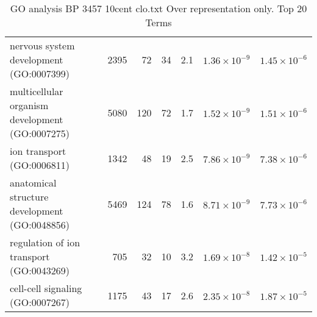 \begin{table}[ht]
\begin{adjustbox}{width=\textwidth}
\begin{tabular}{lrrrrrr}
  nervous system development (GO:0007399) & 2395 & 72 & 34 & 2.1 & $1.36 \times 10^{-9}$ & $1.45 \times 10^{-6}$ \\ 
  multicellular organism development (GO:0007275) & 5080 & 120 & 72 & 1.7 & $1.52 \times 10^{-9}$ & $1.51 \times 10^{-6}$ \\ 
  ion transport (GO:0006811) & 1342 & 48 & 19 & 2.5 & $7.86 \times 10^{-9}$ & $7.38 \times 10^{-6}$ \\ 
  anatomical structure development (GO:0048856) & 5469 & 124 & 78 & 1.6 & $8.71 \times 10^{-9}$ & $7.73 \times 10^{-6}$ \\ 
  regulation of ion transport (GO:0043269) & 705 & 32 & 10 & 3.2 & $1.69 \times 10^{-8}$ & $1.42 \times 10^{-5}$ \\ 
  cell-cell signaling (GO:0007267) & 1175 & 43 & 17 & 2.6 & $2.35 \times 10^{-8}$ & $1.87 \times 10^{-5}$ \\ 
   \hline
\end{tabular}
\end{adjustbox}
\caption{GO analysis BP 3457 10cent clo.txt Over representation only. Top 20 Terms} 
\label{tab:GO analysis BP 3457 10cent clo.txt Over representation only. Top 20 Terms}
\end{table}



